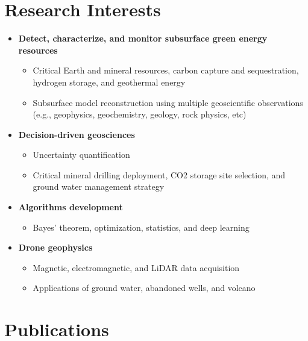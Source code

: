 \documentclass[11pt, a4paper]{article}
\begin{document}
\section*{Research Interests}
\begin{itemize}
	
	\item \textbf{Detect, characterize, and monitor subsurface green energy resources}
	    \begin{itemize}
		\item Critical Earth and mineral resources, carbon capture and sequestration, hydrogen storage, and geothermal energy
		\item Subsurface model reconstruction using multiple geoscientific observations (e.g., geophysics, geochemistry, geology, rock physics, etc)
		\end{itemize}

	\item \textbf{Decision-driven geosciences}
 		\begin{itemize}
		\item Uncertainty quantification
		\item Critical mineral drilling deployment, CO2 storage site selection, and ground water management strategy
		\end{itemize}
		
	\item \textbf{Algorithms development}
	\begin{itemize}
	\item Bayes’ theorem, optimization, statistics, and deep learning
	\end{itemize}		

	\item \textbf{Drone geophysics}
	 	\begin{itemize}
		\item Magnetic, electromagnetic, and LiDAR data acquisition
		\item Applications of ground water, abandoned wells, and volcano
		\end{itemize}

\end{itemize}




\section*{Publications}
\end{document}
